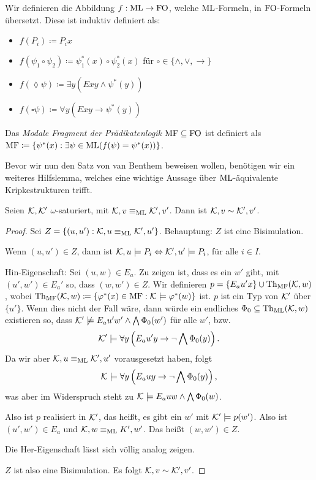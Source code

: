 \begin{definition}
	Wir definieren die Abbildung $f:\operatorname{ML}\to \operatorname{FO}$, welche $\operatorname{ML}$-Formeln, in $\operatorname{FO}$-Formeln übersetzt. Diese ist induktiv definiert als:
	\begin{itemize}
		\item $f(P_i)\coloneqq P_i x$
		\item $f(\psi_1\circ \psi_2)\coloneqq \psi_1^\ast(x)\circ\psi_2^\ast(x)$ für $\circ\in\{\land,\lor,\rightarrow\}$
		\item $f(\lozenge\psi)\coloneqq\exists y (Exy \land \psi^\ast(y))$
		\item $f(\square\psi) \coloneqq \forall y (Exy\rightarrow \psi^\ast(y))$
	\end{itemize}
	Das \textit{Modale Fragment der Prädikatenlogik} $\operatorname{MF}\subseteq \operatorname{FO}$ ist definiert als $\operatorname{MF}\coloneqq\{\psi^\ast(x) : \exists \psi\in \operatorname{ML} (f(\psi)=\psi^\ast(x)) \}$.
\end{definition}

Bevor wir nun den Satz von van Benthem beweisen wollen, benötigen wir ein weiteres Hilfslemma, welches eine wichtige Aussage über $\operatorname{ML}$-äquivalente Kripkestrukturen trifft.

\begin{lemma}
	Seien $\mathcal{K},\mathcal{K}'$ $\omega$-saturiert, mit $\mathcal{K},v\equiv_{\operatorname{ML}}\mathcal{K}',v'$. Dann ist $\mathcal{K},v\sim\mathcal{K}',v'$.
	\label{OmegaSaturiertZuSim}
\end{lemma}
\begin{proof}
	Sei $Z=\{(u,u') : \mathcal{K},u\equiv_{\operatorname{ML}} \mathcal{K}',u'\}$. Behauptung: $Z$ ist eine Bisimulation.
	
	Wenn $(u,u')\in Z$, dann ist $\mathcal{K},u\models P_i\Leftrightarrow \mathcal{K}',u'\models P_i$, für alle $i\in I$.
	
	Hin-Eigenschaft: Sei $(u,w)\in E_a$. Zu zeigen ist, dass es ein $w'$ gibt, mit $(u',w')\in E_a'$ so, dass $(w,w')\in Z$. Wir definieren $p=\{E_a u' x\}\cup \operatorname{Th}_{\operatorname{MF}}(\mathcal{K},w)$, wobei $\operatorname{Th}_{\operatorname{MF}}(\mathcal{K},w)\coloneqq\{\varphi^\ast(x)\in \operatorname{MF} : \mathcal{K}\models\varphi^\ast(w)\}$ ist. $p$ ist ein Typ von $\mathcal{K}'$ über $\{u'\}$. 
	Wenn dies nicht der Fall wäre, dann würde ein endliches $\Phi_0\subseteq \operatorname{Th}_{\operatorname{ML}}(\mathcal{K},w)$ existieren so, dass $\mathcal{K}'\not\models E_a u' w' \land \bigwedge \Phi_0(w')$ für alle $w'$, bzw. 
	$$\mathcal{K}'\models\forall y \left(E_a u' y \rightarrow \neg \bigwedge\Phi_0(y)\right).$$ 
	Da wir aber $\mathcal{K},u\equiv_{\operatorname{ML}} \mathcal{K}',u'$ vorausgesetzt haben, folgt 
	$$\mathcal{K}\models \forall y \left(E_a u y \rightarrow \neg \bigwedge\Phi_0(y)\right),$$ 
	was aber im Widerspruch steht zu $\mathcal{K}\models E_a u w \land \bigwedge\Phi_0(w)$.
	
	Also ist $p$ realisiert in $\mathcal{K}'$, das heißt, es gibt ein $w'$ mit $\mathcal{K}'\models p(w')$. Also ist $(u',w')\in E_a$ und $\mathcal{K},w\equiv_{\operatorname{ML}} K',w'$. Das heißt $(w,w')\in Z$.
	
	Die Her-Eigenschaft lässt sich völlig analog zeigen.
	
	$Z$ ist also eine Bisimulation. Es folgt $\mathcal{K},v \sim \mathcal{K}',v'$.
\end{proof}

